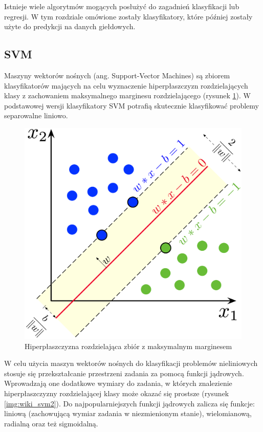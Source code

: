 \documentclass[a4paper, twoside, 11pt, openright]{article}
\begin{document}
Istnieje wiele algorytmów mogących posłużyć do zagadnień klasyfikacji lub regresji. W tym rozdziale omówione zostały klasyfikatory, które później zostały użyte do predykcji na danych giełdowych.

\subsection{SVM}

Maszyny wektorów nośnych (ang. Support-Vector Machines)\cite{svm} są zbiorem klasyfikatorów mających na celu wyznaczenie hiperpłaszczyzn rozdzielających klasy z zachowaniem maksymalnego marginesu rozdzielającego (rysunek \ref{img:wiki_svm}). W podstawowej wersji klasyfikatory SVM potrafią skutecznie klasyfikować problemy separowalne liniowo.


\begin{figure}[H]
\centering \includegraphics[scale=0.9]{img/svm.png}
\caption{Hiperpłaszczyzna rozdzielająca zbiór z maksymalnym marginesem \cite{wikisvm}}
\label{img:wiki_svm}
\end{figure}

W celu użycia maszyn wektorów nośnych do klasyfikacji problemów nieliniowych stosuje się przekształcanie przestrzeni zadania za pomocą funkcji jądrowych. Wprowadzają one dodatkowe wymiary do zadania, w których znalezienie hiperpłaszczyzny rozdzielającej klasy może okazać się prostsze (rysunek \ref{img:wiki_svm2}). Do najpopularniejszych funkcji jądrowych zalicza się funkcje: liniową (zachowującą wymiar zadania w niezmienionym stanie), wielomianową, radialną oraz też sigmoidalną.
\end{document}
